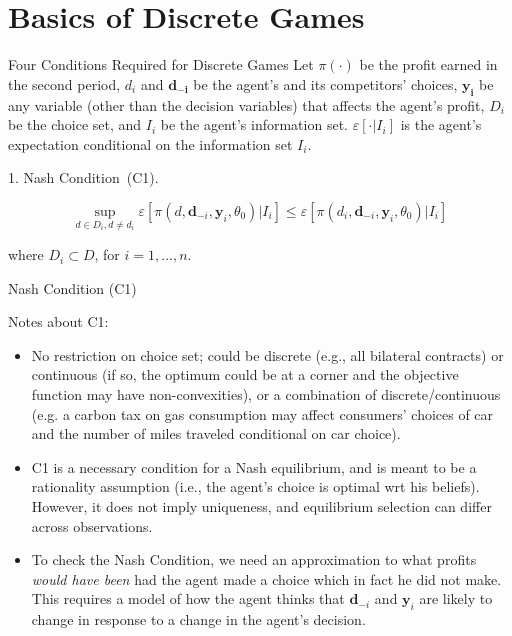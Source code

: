 \section{Basics of Discrete Games}

\begin{frame}{Four Conditions Required for Discrete Games}
Let $\pi(\cdot)$ be the profit earned in the second period, $d_i$ and $\mathbf{d_{-i}}$
be the agent's and its competitors' choices, $\mathbf{y_i}$ be any variable (other than the decision variables) that affects the agent's profit, $D_i$ be the choice set, and $I_i$ be the agent's information set.  \large{$\varepsilon[\cdot|I_i]$} \normalsize is the agent's expectation conditional on the information set $I_i$.
\vspace{0.2in}

1. Nash Condition\ (C1).

\begin{equation*}
\sup_{d\in D_{i},d\neq d_{i}}\varepsilon\left[ \pi (d,\mathbf{d}_{-i},\mathbf{y}_{i},\theta _{0})|\mathit{I}_{i}\right] \leq \varepsilon\left[ \pi (d_{i},\mathbf{d}_{-i},\mathbf{y}_{i},\theta _{0})|\mathit{I}_{i}\right] 
\end{equation*}

where $D_{i}\subset D$, for $i=1,...,n$.

\end{frame}

\begin{frame}{Nash Condition (C1)}

Notes about C1:

\begin{itemize}
\small
\item No restriction on choice set; could be discrete (e.g., all bilateral
contracts) or continuous (if so, the optimum could be at a corner and the objective function may
have non-convexities), or a combination of discrete/continuous (e.g. a carbon tax on gas consumption may affect consumers' choices of car and the number of miles
traveled conditional on car choice).

\item C1 is a necessary condition for a Nash equilibrium, and is meant to be a rationality assumption (i.e., the agent's choice is optimal wrt his beliefs).  However, it does not imply uniqueness, and equilibrium selection can differ across observations.

\item To check the Nash Condition, we need an approximation to what profits \textit{%
would have been} had the agent made a choice which in fact he did not make.
This requires a model of how the agent thinks that $\mathbf{d}_{-i}$ and $%
\mathbf{y}_{i}$ are likely to change in response to a change in the agent's
decision. 

\end{itemize}

\end{frame}


